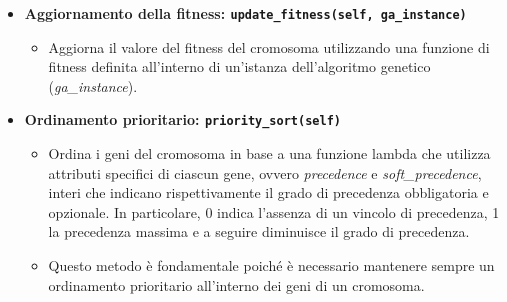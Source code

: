 \begin{itemize}



    \item \textbf{Aggiornamento della fitness: \texttt{update\_fitness(self, ga\_instance)}}
    \begin{itemize}
        \item Aggiorna il valore del fitness del cromosoma utilizzando una funzione di fitness definita all'interno di un'istanza dell'algoritmo genetico (\emph{ga\_instance}).
    \end{itemize}


    \item \textbf{Ordinamento prioritario: \texttt{priority\_sort(self)}}
    \begin{itemize}
        \item Ordina i geni del cromosoma in base a una funzione lambda che utilizza attributi specifici di ciascun gene, ovvero \emph{precedence} e \emph{soft\_precedence}, interi che indicano rispettivamente il grado di precedenza obbligatoria e opzionale. In particolare, 0 indica l'assenza di un vincolo di precedenza, 1 la precedenza massima e a seguire diminuisce il grado di precedenza.
        \item Questo metodo è fondamentale poiché è necessario mantenere sempre un ordinamento prioritario all'interno dei geni di un cromosoma.
    \end{itemize}


\end{itemize}
